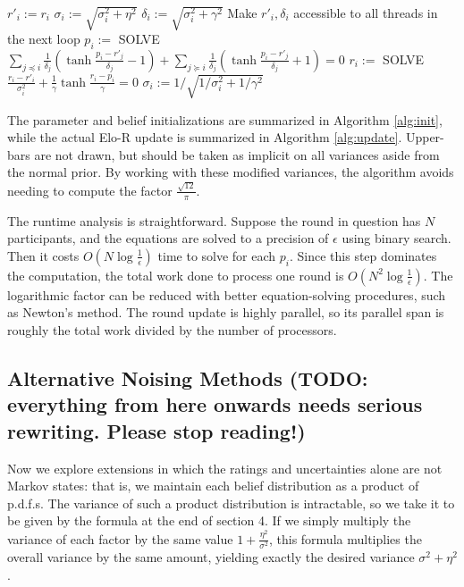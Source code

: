 \documentclass{article}
\begin{document}
\begin{algorithm}
	\caption{$update()$}
	\label{alg:update}
	\begin{algorithmic}
		\STATE $r'_i := r_i$
		\STATE $\sigma_i := \sqrt{\sigma_i^2 + \eta^2}$
		\STATE $\delta_i := \sqrt{\sigma_i^2 + \gamma^2}$
		\STATE Make $r'_i,\delta_i$ accessible to all threads in the next loop
		\ENDFOR
		\STATE $p_i := $ SOLVE $\sum_{j\preceq i}\frac{1}{\delta_j}\left( \tanh\frac {p_i - r'_j} {\delta_j} - 1 \right) + \sum_{j\succeq i}\frac{1}{\delta_j}\left( \tanh\frac {p_i - r'_j} {\delta_j} + 1 \right) = 0$
		\STATE $r_i := $ SOLVE $\frac{r_i-r'_i}{\sigma_i^2} + \frac{1}{\gamma} \tanh \frac {r_i-p_i} {\gamma} = 0$
		\STATE $\sigma_i := 1 / \sqrt{1/\sigma_i^2 + 1/\gamma^2}$
		\ENDFOR
	\end{algorithmic}
\end{algorithm}

The parameter and belief initializations are summarized in Algorithm \ref{alg:init}, while the actual Elo-R update is summarized in Algorithm \ref{alg:update}. Upper-bars are not drawn, but should be taken as implicit on all variances aside from the normal prior. By working with these modified variances, the algorithm avoids needing to compute the factor $\frac{\sqrt{12}}{\pi}$.

The runtime analysis is straightforward. Suppose the round in question has $N$ participants, and the equations are solved to a precision of $\epsilon$ using binary search. Then it costs $O(N\log\frac 1\epsilon)$ time to solve for each $p_i$. Since this step dominates the computation, the total work done to process one round is $O(N^2\log\frac 1\epsilon)$. The logarithmic factor can be reduced with better equation-solving procedures, such as Newton's method. The round update is highly parallel, so its parallel span is roughly the total work divided by the number of processors.

\subsection{Alternative Noising Methods (TODO: everything from here onwards needs serious rewriting. Please stop reading!)}

Now we explore extensions in which the ratings and uncertainties alone are not Markov states: that is, we maintain each belief distribution as a product of p.d.f.s. The variance of such a product distribution is intractable, so we take it to be given by the formula at the end of section 4. If we simply multiply the variance of each factor by the same value $1 + \frac{\eta^2}{\sigma^2}$, this formula multiplies the overall variance by the same amount, yielding exactly the desired variance $\sigma^2+\eta^2$.
\end{document}
